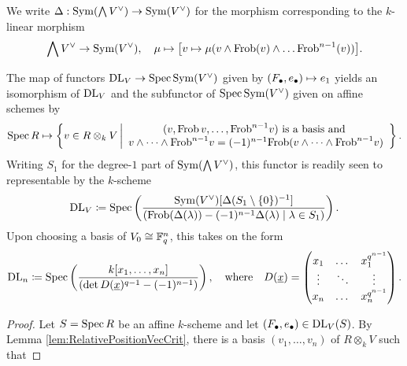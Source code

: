 \documentclass[../main.tex]{subfiles}
\begin{document}
We write $\Delta: \operatorname{Sym}(\bigwedge V^\vee) \to \operatorname{Sym}(V^\vee)$ for the morphism corresponding
to the $k$-linear morphism 
\begin{equation*}
  \bigwedge V^\vee \to \operatorname{Sym}(V^\vee), \quad \mu \mapsto \big[v \mapsto 
  \mu(v \wedge \mathrm{Frob}(v) \wedge \dots \mathrm{Frob}^{n-1}(v))\big].
\end{equation*}

\begin{prop}\label{prop:prop_YwExplicitely}
  The map of functors $\mathrm{DL}_V \to \operatorname{Spec} \operatorname{Sym}(V^\vee)$ given by 
  $(F_\bullet, e_\bullet) \mapsto e_1$ 
  yields an isomorphism of $\mathrm{DL}_V$ and the subfunctor of $\operatorname{Spec} \operatorname{Sym}(V^\vee)$ given on
  affine schemes by
  \begin{equation*}
    \spec R \mapsto \left\{v \in R \otimes_k V \, \bigg \vert
      \begin{array}c 
        (v, \Frob\, v, \dots, \Frob^{n-1} v) \text{ is a basis and } \\ 
        v \wedge \dots \wedge \Frob^{n-1} v = (-1)^{n-1} \Frob( v \wedge \dots
        \wedge \Frob^{n-1}v) 
      \end{array}\right\}.
  \end{equation*}
  Writing $S_1$ for the degree-$1$ part of $\operatorname{Sym}(\bigwedge V^\vee)$,
  this functor is readily seen to representable by the $k$-scheme
  \begin{equation*}
    \mathrm{DL}_V \coloneq \operatorname{Spec} \left( \frac{\operatorname{Sym}(V^\vee)[\Delta(S_1 \setminus\{0\})^{-1}]}
    {(\mathrm{Frob} (\Delta(\lambda)) - (-1)^{n-1} \Delta(\lambda) \mid \lambda \in S_1)} \right).
  \end{equation*}
  Upon choosing a basis of $V_0 \cong \mathbb{F}_q^n$, this takes on the form
  \begin{equation*}
    \mathrm{DL}_n \coloneq \operatorname{Spec} \left(\frac{k[x_1, \dots, x_n]}{\left(
        \det D(\underline x)^{q-1} - (-1)^{n-1}\right)} \right), \quad
        \text{where} \quad D(\underline x) = 
          \begin{pmatrix}
            x_1 & \dots & x_1^{q^{n-1}}\\
            \vdots & \ddots  & \vdots \\
            x_n & \dots & x_n^{q^{n-1}}
          \end{pmatrix}.
  \end{equation*}
\begin{proof}
  Let $S = \operatorname{Spec} R$ be an affine $k$-scheme and let $(F_\bullet, e_\bullet) \in \mathrm{DL}_V(S)$. 
  By Lemma \ref{lem:RelativePositionVecCrit}, there is a basis 
  $(v_1, \dots, v_n)$ of $R \otimes_k V$ such that 

\end{proof}
\end{prop}
\end{document}
